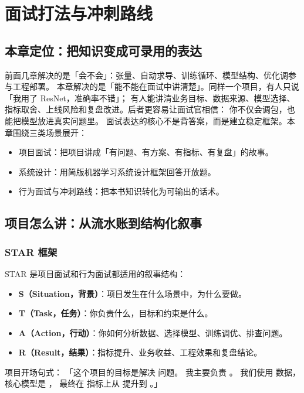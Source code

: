 \chapter{面试打法与冲刺路线}
\section{本章定位：把知识变成可录用的表达}
前面几章解决的是「会不会」：张量、自动求导、训练循环、模型结构、优化调参与工程部署。
本章解决的是「能不能在面试中讲清楚」。同样一个项目，有人只说「我用了 ResNet，准确率不错」；
有人能讲清业务目标、数据来源、模型选择、指标取舍、上线风险和复盘改进。后者更容易让面试官相信：
你不仅会调包，也能把模型放进真实问题里。
面试表达的核心不是背答案，而是建立稳定框架。本章围绕三类场景展开：
\begin{itemize}[leftmargin=2em]
  \item 项目面试：把项目讲成「有问题、有方案、有指标、有复盘」的故事。
  \item 系统设计：用简版机器学习系统设计框架回答开放题。
  \item 行为面试与冲刺路线：把本书知识转化为可输出的话术。
\end{itemize}
\section{项目怎么讲：从流水账到结构化叙事}
\subsection{STAR 框架}
STAR 是项目面试和行为面试都适用的叙事结构：
\begin{itemize}[leftmargin=2em]
  \item \textbf{S（Situation，背景）}：项目发生在什么场景中，为什么要做。
  \item \textbf{T（Task，任务）}：你负责什么，目标和约束是什么。
  \item \textbf{A（Action，行动）}：你如何分析数据、选择模型、训练调优、排查问题。
  \item \textbf{R（Result，结果）}：指标提升、业务收益、工程效果和复盘结论。
\end{itemize}
\begin{quickcard}
项目开场句式：
「这个项目的目标是解决 \underline{\hspace{3em}} 问题。
我主要负责 \underline{\hspace{3em}}。
我们使用 \underline{\hspace{3em}} 数据，核心模型是 \underline{\hspace{3em}}，
最终在 \underline{\hspace{3em}} 指标上从 \underline{\hspace{3em}} 提升到 \underline{\hspace{3em}}。」
\end{quickcard}
